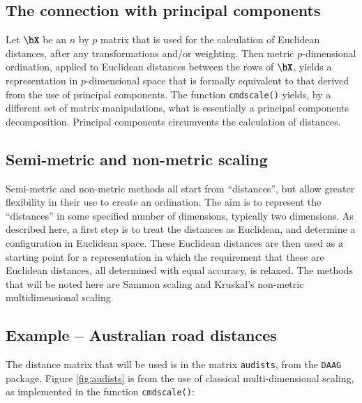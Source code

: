 \documentclass{tufte-book}\usepackage[]{graphicx}\usepackage[]{color}
\newcommand{\txtt}[1]{\texttt{#1}}
\begin{document}
\subsection*{The connection with principal components}
Let $\bX$ be an $n$ by $p$ matrix that is used for the calculation of
Euclidean distances, after any transformations and/or weighting.
Then metric $p$-dimensional ordination, applied to Euclidean distances
between the rows of $\bX$, yields a representation in $p$-dimensional
space that is formally equivalent to that derived from the use of
principal components.  The function \txtt{cmdscale()} yields, by a
different set of matrix manipulations, what is essentially a principal
components decomposition.  Principal components circumvents the
calculation of distances.

\subsection*{Semi-metric and non-metric scaling}

Semi-metric and non-metric methods all start from ``distances'', but
allow greater flexibility in their use to create an ordination. The
aim is to represent the ``distances'' in some specified number of
dimensions, typically two dimensions.  As described here, a first step
is to treat the distances as Euclidean, and determine a configuration
in Euclidean space.  These Euclidean distances are then used as a
starting point for a representation in which the requirement that
these are Euclidean distances, all determined with equal accuracy, is
relaxed.  The methods that will be noted here are Sammon scaling and
Kruskal's non-metric multidimensional scaling.

\subsection*{Example -- Australian road distances}
The distance matrix that will be used is in the matrix \txtt{audists},
from the \txtt{DAAG} package.  Figure \ref{fig:audists} is from the
use of classical multi-dimensional scaling, as implemented in the
function \txtt{cmdscale()}:
\end{document}
